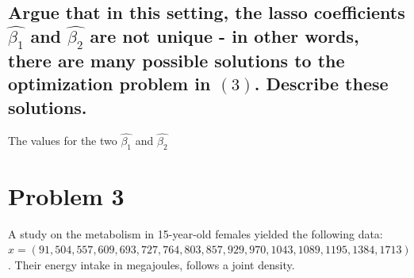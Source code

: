 \documentclass[20pt]{article} %
\begin{document}
\subsection{Argue that in this setting, the lasso coefficients $\hat{\beta_1}$ and $\hat{\beta_2}$ are not unique - in other words, there are many possible solutions to the optimization problem in $(3)$. Describe these solutions.}
The values for the two $\hat{\beta_1}$ and $\hat{\beta_2}$

\section{Problem 3}
A study on the metabolism in 15-year-old females yielded the following data:
$x = (91, 504, 557, 609, 693, 727, 764, 803, 857, 929, 970, 1043, 1089, 1195, 1384, 1713)$.  Their energy intake in megajoules, follows a joint density.
\end{document}
